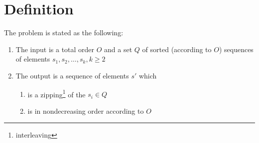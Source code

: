 \section{Definition}
\label{tree:merging:def}

The problem is stated as the following:

\begin{enumerate}
\item The input is a total order $O$ and a set $Q$ of sorted (according to $O$) sequences of elements ${s_1, s_2, \dots, s_k}, k \geq 2$
\item The output is a sequence of elements $s'$ which
	\begin{enumerate}
	\item is a zipping\footnote{interleaving} of the $s_i \in Q$
	\item is in nondecreasing order according to $O$
	\end{enumerate}
\end{enumerate}

